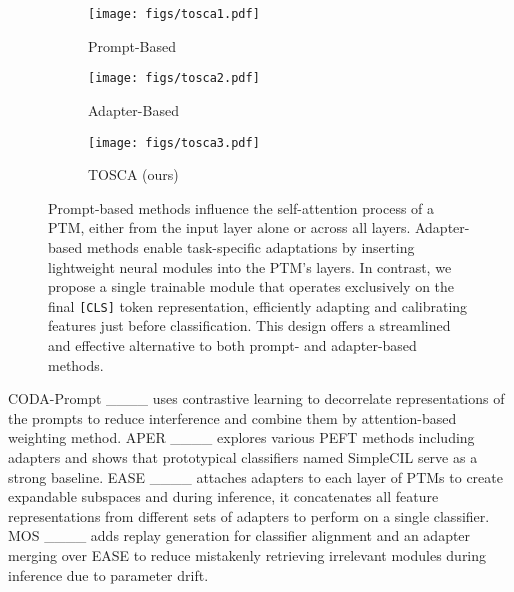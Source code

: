 \begin{figure}[t]
\captionsetup{font=small}
  \centering
  \begin{subfigure}{0.463\textwidth}
    \texttt{[image: figs/tosca1.pdf]}
    \caption{Prompt-Based}
    \label{fig:params}
  \end{subfigure}
  \hfill
  \begin{subfigure}{0.23\textwidth}
    \texttt{[image: figs/tosca2.pdf]}
    \caption{Adapter-Based}
    \label{fig:abla_heat}
  \end{subfigure}
  \hfill
  \begin{subfigure}{0.2\textwidth}
    \texttt{[image: figs/tosca3.pdf]}
    \caption{TOSCA (ours)}
    \label{fig:abla_line}
  \end{subfigure}
\caption{Prompt-based methods influence the self-attention process of a PTM, either from the input layer alone or across all layers. Adapter-based methods enable task-specific adaptations by inserting lightweight neural modules into the PTM’s layers. In contrast, we propose a single trainable module that operates exclusively on the final \texttt{[CLS]} token representation, efficiently adapting and calibrating features just before classification. This design offers a streamlined and effective alternative to both prompt- and adapter-based methods.}
\end{figure}

CODA-Prompt ____ uses contrastive learning to decorrelate representations of the prompts to reduce interference and combine them by attention-based weighting method.
APER ____ explores various PEFT methods including adapters and shows that prototypical classifiers named SimpleCIL serve as a strong baseline. 
EASE ____ attaches adapters to each layer of PTMs to create expandable subspaces and during inference, it concatenates all feature representations from different sets of adapters to perform on a single classifier. 
MOS ____ adds replay generation for classifier alignment and an adapter merging over EASE to reduce mistakenly retrieving irrelevant modules during inference due to parameter drift.